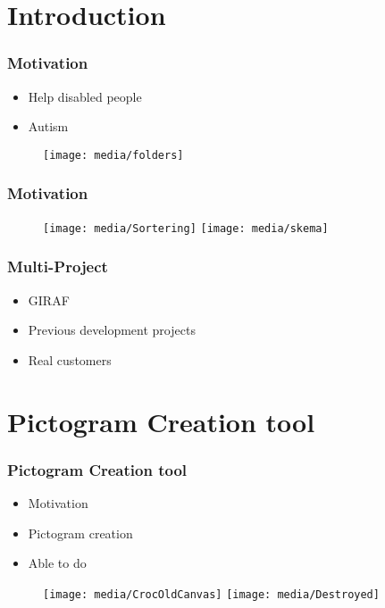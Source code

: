 


\section{Introduction}
\begin{frame}
	\frametitle{Motivation}
	\begin{itemize}
		\item Help disabled people
		\item Autism
	\end{itemize}
	\begin{figure}
		\texttt{[image: media/folders]}
	\end{figure}
\end{frame}

\begin{frame}
	\frametitle{Motivation}
	\begin{figure}
		\texttt{[image: media/Sortering]}		
		\hfill
		\texttt{[image: media/skema]}
	\end{figure}
\end{frame}

\begin{frame}
	\frametitle{Multi-Project}
	\begin{itemize}
		\item GIRAF
		\item Previous development projects
		\item Real customers
	\end{itemize}
\end{frame}
	
	
	
\section{Pictogram Creation tool}
\begin{frame}
	\frametitle{Pictogram Creation tool}
	\begin{itemize}
		\item Motivation
		\item Pictogram creation
		\item Able to do
	\end{itemize}
	\begin{figure}
		\texttt{[image: media/CrocOldCanvas]}
		\hfill
		\texttt{[image: media/Destroyed]}
	\end{figure}
\end{frame}